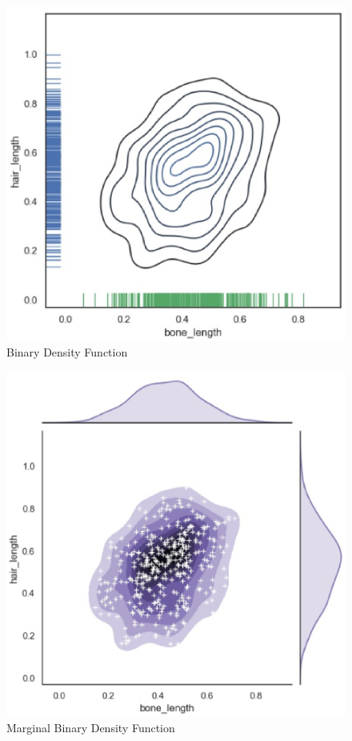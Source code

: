 \begin{figure}[h]\centering
	\includegraphics[scale=0.4]{figures/BDF.eps}
	\caption{Binary Density Function}
\end{figure}

\begin{figure}[h]\centering
	\includegraphics[scale=0.4]{figures/MBDF.eps}
	\caption{Marginal Binary Density Function}
\end{figure}


